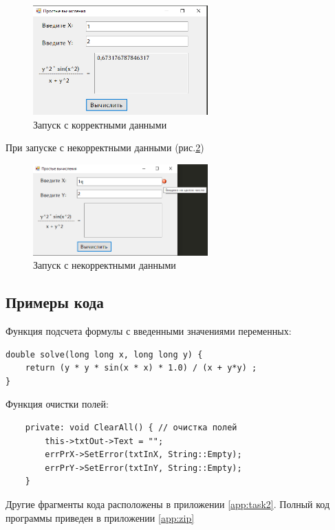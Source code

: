 \begin{figure}[!h]
    \centering
    \includegraphics[width = 0.6\textwidth]{images/Task2/Works1.png}
    \caption{Запуск с корректными данными}
    \label{fig:WorkForm2}
\end{figure}

При запуске с некорректными данными (рис.\ref{fig:BadInputNotIntForm2})

\begin{figure}[!h]
    \centering
    \includegraphics[width = 0.6\textwidth]{images/Task2/BadInputNotInt1.png}
    \caption{Запуск с некорректными данными}
    \label{fig:BadInputNotIntForm2}
\end{figure}

\subsection{Примеры кода}

Функция подсчета формулы с введенными значениями переменных:

\begin{verbatim}
double solve(long long x, long long y) {
	return (y * y * sin(x * x) * 1.0) / (x + y*y) ;
}
\end{verbatim}

Функция очистки полей:

\begin{verbatim}
	private: void ClearAll() { // очистка полей
		this->txtOut->Text = "";
		errPrX->SetError(txtInX, String::Empty);
		errPrY->SetError(txtInY, String::Empty);
	}
\end{verbatim}

Другие фрагменты кода расположены в приложении \ref{app:task2}. Полный код программы приведен в приложении \ref{app:zip}
